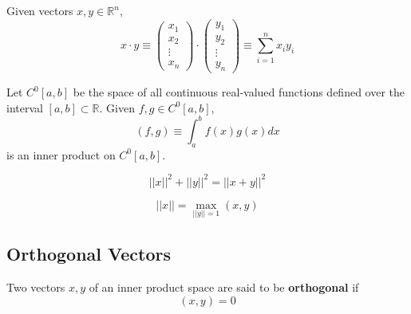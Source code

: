   \begin{example}
    Given vectors $x, y \in \mathbb{R}^n$, 
    \begin{equation}
      x \cdot y \equiv  \begin{pmatrix}
      x_1\\x_2\\\vdots\\x_n
      \end{pmatrix} \cdot \begin{pmatrix}
      y_1\\y_2\\\vdots\\y_n
      \end{pmatrix} \equiv \sum_{i=1}^n x_i y_i
    \end{equation}
  \end{example}

  \begin{example}
    Let $C^0[a, b]$ be the space of all continuous real-valued functions defined over the interval $[a,b] \subset \mathbb{R}$. Given $f, g \in C^0[a,b]$, 
    \begin{equation}
      (f, g) \equiv \int_a^b f(x)g(x) d x
    \end{equation}
    is an inner product on $C^0[a, b]$. 
  \end{example}

  \begin{theorem}
    \begin{equation}
      ||x||^2 + ||y||^2 = ||x+y||^2
    \end{equation}
  \end{theorem}

  \begin{theorem}
    \begin{equation}
      ||x|| = \max_{||y||=1} (x, y)
    \end{equation}
  \end{theorem} 

\subsection{Orthogonal Vectors}

  \begin{definition}
    Two vectors $x, y$ of an inner product space are said to be \textbf{orthogonal} if 
    \begin{equation}
      (x, y) = 0
    \end{equation}
  \end{definition}

